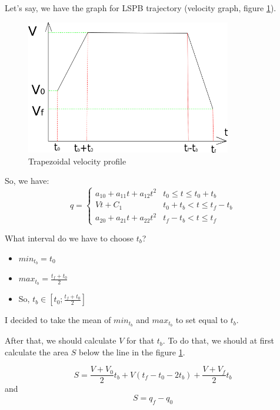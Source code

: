 \documentclass[12pt, a4paper]{report}
\begin{document}
Let's say, we have the graph for LSPB trajectory (velocity graph, figure \ref{fig:mesh2}).

\begin{figure}[H]
	\centering
		\includegraphics[width=0.8\textwidth]{trapezia} %
	\caption{Trapezoidal velocity profile} %
	\label{fig:mesh2}
\end{figure}

So, we have:
\begin{equation}
q = \begin{cases} 
      a_{10} + a_{11}t + a_{12}t^2 & t_0 \leq t \leq t_0 + t_b \\
      Vt + C_1 & t_0 + t_b < t \leq t_f - t_b \\
      a_{20} + a_{21}t + a_{22}t^2 & t_f - t_b < t \leq t_f 

\end{cases}
\end{equation}

What interval do we have to choose $t_b$?
\begin{itemize}
	\item $min_{t_b} = t_0$
	\item $max_{t_b} = \frac{t_f+t_0}{2}$
	\item So, $t_b \in [t_0; \frac{t_f+t_0}{2}]$
\end{itemize}

I decided to take the mean of $min_{t_b}$ and $max_{t_b}$ to set equal to $t_b$.

After that, we should calculate $V$ for that $t_b$. To do that, we should at first calculate the area $S$ below the line in the figure \ref{fig:mesh2}.

\begin{equation}
	S = \frac{V+V_0}{2}t_b + V(t_f-t_0-2t_b) + \frac{V+V_f}{2}t_b
\end{equation}
and
\begin{equation}
	S = q_f - q_0
\end{equation}
\end{document}
